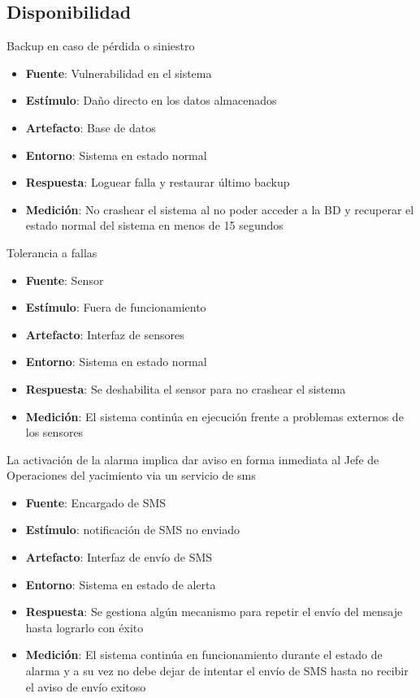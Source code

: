 \subsection{Disponibilidad}

Backup en caso de pérdida o siniestro
\begin{itemize}
\item {\bf Fuente}: Vulnerabilidad en el sistema
\item {\bf Estímulo}: Daño directo en los datos almacenados
\item {\bf Artefacto}: Base de datos
\item {\bf Entorno}: Sistema en estado normal
\item {\bf Respuesta}: Loguear falla y restaurar último backup
\item {\bf Medición}: No crashear el sistema al no poder acceder a la BD y recuperar el estado normal del sistema en menos de 15 segundos 
\end{itemize}

Tolerancia a fallas
\begin{itemize}
\item {\bf Fuente}: Sensor
\item {\bf Estímulo}: Fuera de funcionamiento
\item {\bf Artefacto}: Interfaz de sensores
\item {\bf Entorno}: Sistema en estado normal
\item {\bf Respuesta}: Se deshabilita el sensor para no crashear el sistema
\item {\bf Medición}: El sistema continúa en ejecución frente a problemas externos de los sensores
\end{itemize}

La activación de la alarma implica dar aviso en forma inmediata al Jefe de Operaciones del yacimiento via un servicio de sms
\begin{itemize}
\item {\bf Fuente}: Encargado de SMS
\item {\bf Estímulo}: notificación de SMS no enviado
\item {\bf Artefacto}: Interfaz de envío de SMS
\item {\bf Entorno}: Sistema en estado de alerta
\item {\bf Respuesta}: Se gestiona algún mecanismo para repetir el envío del mensaje hasta lograrlo con éxito
\item {\bf Medición}: El sistema continúa en funcionamiento durante el estado de alarma y a su vez no debe dejar de intentar el envío de SMS hasta no recibir el aviso de envío exitoso
\end{itemize}

